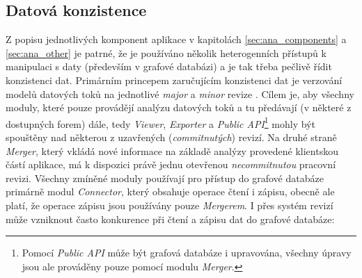 \subsection{Datová konzistence}
\label{sec:ana_transactions}
Z popisu jednotlivých komponent aplikace v kapitolách \ref{sec:ana_components} a \ref{sec:ana_other} je patrné, že je používáno několik heterogenních přístupů k manipulaci s daty (především v grafové databázi) a je tak třeba pečlivě řídit konzistenci dat. Primárním princepem zaručujícím konzistenci dat je verzování modelů datových toků na jednotlivé \textit{major} a \textit{minor} revize \cite{Sykora17}.
Cílem je, aby všechny moduly, které pouze provádějí analýzu datových toků a tu předávají (v některé z dostupných forem) dále, tedy \textit{Viewer}, \textit{Exporter} a \textit{Public API}\footnote{Pomocí \textit{Public API} může být grafová databáze i upravována, všechny úpravy jsou ale prováděny pouze pomocí modulu \textit{Merger}.} mohly být spouštěny nad některou z uzavřených (\textit{commitnutých}) revizí. Na druhé straně \textit{Merger}, který vkládá nové informace na základě analýzy provedené klientskou částí aplikace, má k dispozici právě jednu otevřenou \textit{necommitnutou} pracovní revizi. Všechny zmíněné moduly používají pro přístup do grafové databáze primárně modul \textit{Connector}, který obsahuje operace čtení i zápisu, obecně ale platí, že operace zápisu jsou používány pouze \textit{Mergerem}.
I přes systém revizí může vzniknout často konkurence při čtení a zápisu dat do grafové databáze:

